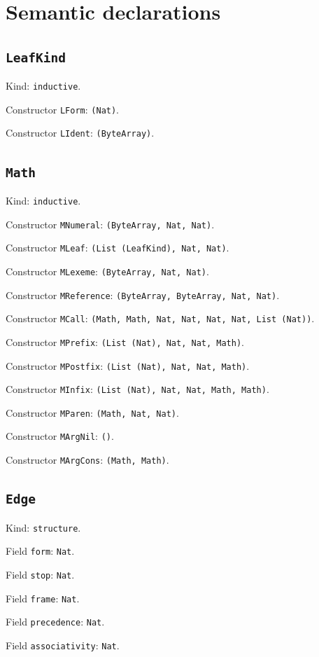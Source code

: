 \documentclass[11pt]{article}
\begin{document}
\section*{Semantic declarations}
\subsection*{\texttt{LeafKind}}
\noindent Kind: \texttt{inductive}.\par
\noindent Constructor \texttt{LForm}: \texttt{(Nat)}.\par
\noindent Constructor \texttt{LIdent}: \texttt{(ByteArray)}.\par
\subsection*{\texttt{Math}}
\noindent Kind: \texttt{inductive}.\par
\noindent Constructor \texttt{MNumeral}: \texttt{(ByteArray, Nat, Nat)}.\par
\noindent Constructor \texttt{MLeaf}: \texttt{(List (LeafKind), Nat, Nat)}.\par
\noindent Constructor \texttt{MLexeme}: \texttt{(ByteArray, Nat, Nat)}.\par
\noindent Constructor \texttt{MReference}: \texttt{(ByteArray, ByteArray, Nat, Nat)}.\par
\noindent Constructor \texttt{MCall}: \texttt{(Math, Math, Nat, Nat, Nat, Nat, List (Nat))}.\par
\noindent Constructor \texttt{MPrefix}: \texttt{(List (Nat), Nat, Nat, Math)}.\par
\noindent Constructor \texttt{MPostfix}: \texttt{(List (Nat), Nat, Nat, Math)}.\par
\noindent Constructor \texttt{MInfix}: \texttt{(List (Nat), Nat, Nat, Math, Math)}.\par
\noindent Constructor \texttt{MParen}: \texttt{(Math, Nat, Nat)}.\par
\noindent Constructor \texttt{MArgNil}: \texttt{()}.\par
\noindent Constructor \texttt{MArgCons}: \texttt{(Math, Math)}.\par
\subsection*{\texttt{Edge}}
\noindent Kind: \texttt{structure}.\par
\noindent Field \texttt{form}: \texttt{Nat}.\par
\noindent Field \texttt{stop}: \texttt{Nat}.\par
\noindent Field \texttt{frame}: \texttt{Nat}.\par
\noindent Field \texttt{precedence}: \texttt{Nat}.\par
\noindent Field \texttt{associativity}: \texttt{Nat}.\par
\end{document}
